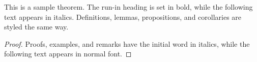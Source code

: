 \documentclass[runningheads]{llncs}
\begin{document}
\begin{theorem}
This is a sample theorem. The run-in heading is set in bold, while
the following text appears in italics. Definitions, lemmas,
propositions, and corollaries are styled the same way.
\end{theorem}
%
%
\begin{proof}
Proofs, examples, and remarks have the initial word in italics,
while the following text appears in normal font.
\end{proof}

%
%
%
% 
% 
%
\end{document}
